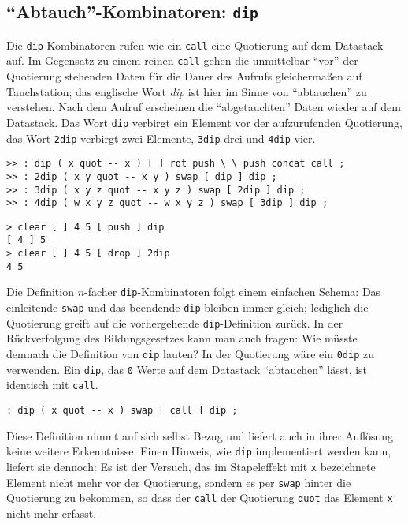 \subsection{"`Abtauch"'-Kombinatoren: \texttt{dip}}\label{Sec:dip}

Die \verb|dip|-Kombinatoren rufen wie ein \verb|call| eine Quotierung auf dem Datastack auf. Im Gegensatz zu einem reinen \verb|call| gehen die unmittelbar "`vor"' der Quotierung stehenden Daten für die Dauer des Aufrufs gleichermaßen auf Tauchstation; das englische Wort \emph{dip} ist hier im Sinne von "`abtauchen"' zu verstehen. Nach dem Aufruf erscheinen die "`abgetauchten"' Daten wieder auf dem Datastack. Das Wort \verb|dip| verbirgt ein Element vor der aufzurufenden Quotierung, das Wort \verb|2dip| verbirgt zwei Elemente, \verb|3dip| drei und \verb|4dip| vier.

\begin{verbatim}
>> : dip ( x quot -- x ) [ ] rot push \ \ push concat call ;
>> : 2dip ( x y quot -- x y ) swap [ dip ] dip ;
>> : 3dip ( x y z quot -- x y z ) swap [ 2dip ] dip ;
>> : 4dip ( w x y z quot -- w x y z ) swap [ 3dip ] dip ;
\end{verbatim}

\begin{verbatim}
> clear [ ] 4 5 [ push ] dip
[ 4 ] 5
> clear [ ] 4 5 [ drop ] 2dip
4 5
\end{verbatim}

Die Definition $n$-facher \verb|dip|-Kombinatoren folgt einem einfachen Schema: Das einleitende \verb|swap| und das beendende \verb|dip| bleiben immer gleich; lediglich die Quotierung greift auf die vorhergehende \verb|dip|-Definition zurück. In der Rückverfolgung des Bildungsgesetzes kann man auch fragen: Wie müsste demnach die Definition von \verb|dip| lauten? In der Quotierung wäre ein \verb|0dip| zu verwenden. Ein \verb|dip|, das \verb|0| Werte auf dem Datastack "`abtauchen"' lässt, ist identisch mit \verb|call|.

\begin{verbatim}
: dip ( x quot -- x ) swap [ call ] dip ;
\end{verbatim}

Diese Definition nimmt auf sich selbst Bezug und liefert auch in ihrer Auflösung keine weitere Erkenntnisse. Einen Hinweis, wie \verb|dip| implementiert werden kann, liefert sie dennoch: Es ist der Versuch, das im Stapeleffekt mit \verb|x| bezeichnete Element nicht mehr vor der Quotierung, sondern es per \verb|swap| hinter die Quotierung zu bekommen, so dass der \verb|call| der Quotierung \verb|quot| das Element \verb|x| nicht mehr erfasst.


